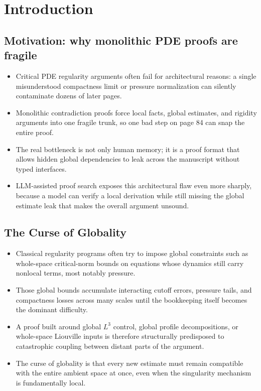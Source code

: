 \documentclass[11pt]{article}
\theoremstyle{plain}
\theoremstyle{definition}
\theoremstyle{remark}
\begin{document}
\section{Introduction}
\label{sec:introduction}

\subsection{Motivation: why monolithic PDE proofs are fragile}
\begin{itemize}
  \item Critical PDE regularity arguments often fail for architectural reasons: a single misunderstood compactness limit or pressure normalization can silently contaminate dozens of later pages.
  \item Monolithic contradiction proofs force local facts, global estimates, and rigidity arguments into one fragile trunk, so one bad step on page 84 can snap the entire proof.
  \item The real bottleneck is not only human memory; it is a proof format that allows hidden global dependencies to leak across the manuscript without typed interfaces.
  \item LLM-assisted proof search exposes this architectural flaw even more sharply, because a model can verify a local derivation while still missing the global estimate leak that makes the overall argument unsound.
\end{itemize}

\subsection{The Curse of Globality}
\begin{itemize}
  \item Classical regularity programs often try to impose global constraints such as whole-space critical-norm bounds on equations whose dynamics still carry nonlocal terms, most notably pressure.
  \item Those global bounds accumulate interacting cutoff errors, pressure tails, and compactness losses across many scales until the bookkeeping itself becomes the dominant difficulty.
  \item A proof built around global $L^3$ control, global profile decompositions, or whole-space Liouville inputs is therefore structurally predisposed to catastrophic coupling between distant parts of the argument.
  \item The curse of globality is that every new estimate must remain compatible with the entire ambient space at once, even when the singularity mechanism is fundamentally local.
\end{itemize}
\end{document}
